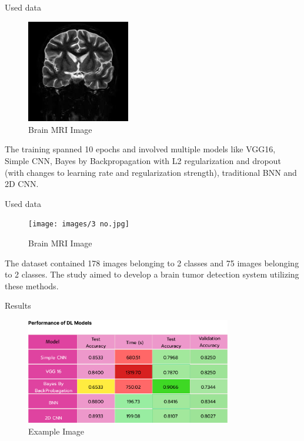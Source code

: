 \documentclass[aspectratio=169,xcolor=dvipsnames, t]{beamer}
\begin{document}
\begin{frame}{Used data}
    \begin{figure}
    \centering
    \includegraphics[width=0.4\textwidth]{images/19 no.jpg}
    \caption{Brain MRI Image}
\end{figure}
The training spanned 10 epochs and involved multiple models like VGG16, Simple CNN, Bayes by Backpropagation with L2 regularization and dropout (with changes to learning rate and regularization strength), traditional BNN and 2D CNN.

\end{frame}

\begin{frame}{Used data}
    \begin{figure}
    \centering
    \texttt{[image: images/3 no.jpg]}
    \caption{Brain MRI Image}
\end{figure}
The dataset contained 178 images belonging to 2 classes and 75 images belonging to 2 classes. The study aimed to develop a brain tumor detection system utilizing these methods.

\end{frame}


\begin{frame}{Results}
   \begin{figure}[h]
    \centering
    \includegraphics[width=0.8\textwidth]{images/table1.png}
    \caption{Example Image}
    \label{fig:example}
\end{figure}

\end{frame}
\end{document}
